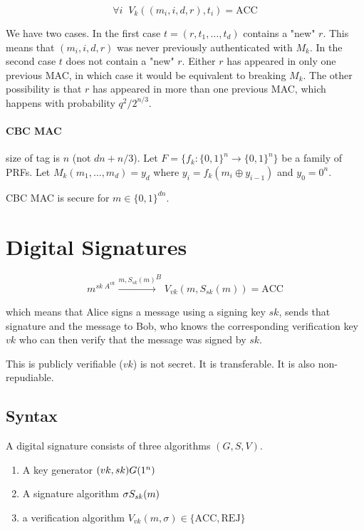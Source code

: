 \documentclass{idc_msc}
\DeclareMathOperator*{\xor}{\oplus}
\let\getsrandom\relax
\newcommand{\getsrandom}{\ensuremath{\overset{R}{\gets}}}
\begin{document}
\[
  \forall i \;\; V_k((m_i, i, d, r), t_i) = \mathrm{ACC}
\]

We have two cases.
In the first case \(t = (r, t_1, \ldots, t_d)\) contains a "new" \(r\).
This means that \((m_i, i, d, r)\) was never previously authenticated with \(M_k\).
In the second case \(t\) does not contain a "new" \(r\).
Either \(r\) has appeared in only one previous MAC, in which case it would be equivalent to breaking \(M_k\).
The other possibility is that \(r\) has appeared in more than one previous MAC, which happens with probability \(q^2/ 2^{n/3}\).

\paragraph{CBC MAC}

size of tag is \(n\) (not \(dn + n/3\)).
Let \(F = \{f_k : \{0, 1\}^n \to \{0, 1\}^n\}\) be a family of PRFs.
Let \(M_k(m_1, \ldots, m_d) = y_d\) where \(y_i = f_k(m_i \xor y_{i-1})\) and \(y_0 = 0^n\).

CBC MAC is secure for \(m \in \{0, 1\}^{dn}\).

\section{Digital Signatures}

\[
  m^{sk \;A^{vk}} \overset{m,S_{sk}(m)}{\longrightarrow}^{B} V_{vk}(m,S_{sk}(m)) = \mathrm{ACC}
\]

which means that Alice signs a message using a signing key \(sk\), sends that signature and the message to Bob, who knows the corresponding verification key \(vk\) who can then verify that the message was signed by \(sk\).

This is publicly verifiable (\(vk\)) is not secret.
It is transferable.
It is also non-repudiable.

\subsection{Syntax}

A digital signature consists of three algorithms \((G,S,V)\).

\begin{enumerate}
  \item A key generator \((vk, sk) \getsrandom G(1^n)\)
  \item A signature algorithm \(\sigma \getsrandom S_{sk}(m)\)
  \item a verification algorithm \(V_{vk}(m,\sigma) \in \{\mathrm{ACC}, \mathrm{REJ}\}\)
\end{enumerate}
\end{document}

